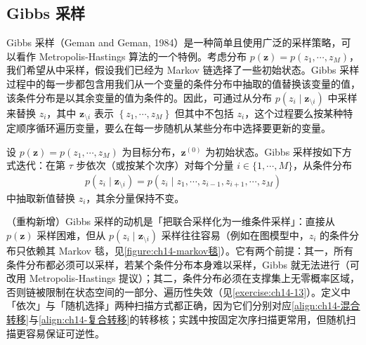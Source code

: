 \documentclass[../../main.tex]{subfiles}
\begin{document}
\subsection{Gibbs 采样}\label{subsection:ch14-gibbs采样}

Gibbs 采样（Geman and Geman, 1984）是一种简单且使用广泛的采样策略，可以看作 Metropolis-Hastings 算法的一个特例。考虑分布 $p(\bm{z})=p\!\left(z_{1},\cdots,z_{M}\right)$，我们希望从中采样，假设我们已经为 Markov 链选择了一些初始状态。Gibbs 采样过程中的每一步都包含用我们从一个变量的条件分布中抽取的值替换该变量的值，该条件分布是以其余变量的值为条件的。因此，可通过从分布 $p\!\left(z_{i}\mid\bm{z}_{\setminus i}\right)$ 中采样来替换 $z_{i}$，其中 $\bm{z}_{\setminus i}$ 表示 $\left\{z_{1},\cdots,z_{M}\right\}$ 但其中不包括 $z_{i}$，这个过程要么按某种特定顺序循环遍历变量，要么在每一步随机从某些分布中选择要更新的变量。

\begin{definition}[Gibbs 采样]\label{definition:ch14-gibbs采样}
设 $p(\bm{z})=p\!\left(z_{1},\cdots,z_{M}\right)$ 为目标分布，$\bm{z}^{(0)}$ 为初始状态。Gibbs 采样按如下方式迭代：在第 $\tau$ 步依次（或按某个次序）对每个分量 $i\in\{1,\cdots,M\}$，从条件分布
\begin{align*}
p\!\left(z_{i}\mid\bm{z}_{\setminus i}\right)=p\!\left(z_{i}\mid z_{1},\cdots,z_{i-1},z_{i+1},\cdots,z_{M}\right)
\end{align*}
中抽取新值替换 $z_{i}$，其余分量保持不变。
\end{definition}

\begin{remark}（重构新增）Gibbs 采样的动机是「把联合采样化为一维条件采样」：直接从 $p(\bm{z})$ 采样困难，但从 $p\!\left(z_{i}\mid\bm{z}_{\setminus i}\right)$ 采样往往容易（例如在图模型中，$z_{i}$ 的条件分布只依赖其 Markov 毯，见\cref{figure:ch14-markov毯}）。它有两个前提：其一，所有条件分布都必须可以采样，若某个条件分布本身难以采样，Gibbs 就无法进行（可改用 Metropolis-Hastings 提议）；其二，条件分布必须在支撑集上无零概率区域，否则链被限制在状态空间的一部分、遍历性失效（见\cref{exercise:ch14-13}）。定义中「依次」与「随机选择」两种扫描方式都正确，因为它们分别对应\eqref{align:ch14-混合转移}与\eqref{align:ch14-复合转移}的转移核；实践中按固定次序扫描更常用，但随机扫描更容易保证可逆性。
\end{remark}
\end{document}
